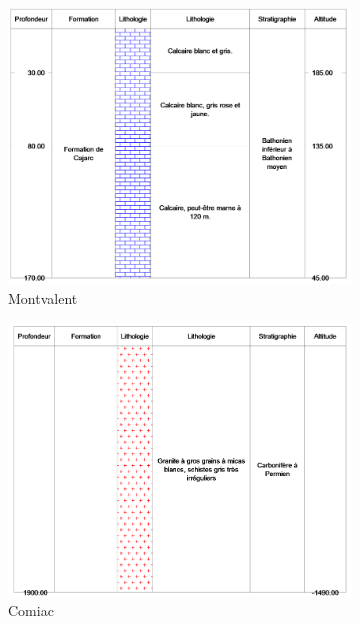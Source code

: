 \documentclass[11pt,french,a4paper]{article}
\begin{document}
\begin{figure}
     \centering
     \begin{subfigure}[b]{0.48\textwidth}
         \centering
         \includegraphics[width=\textwidth]{image/annexe/chap4/minees/montvalent.png}
         \caption{Montvalent}
     \end{subfigure}
     \begin{subfigure}[b]{0.48\textwidth}
         \centering
         \includegraphics[width=\textwidth]{image/annexe/chap4/minees/comiac.png}
         \caption{Comiac}
     \end{subfigure}
     \begin{subfigure}[b]{0.48\textwidth}

\end{subfigure}
\end{figure}
\end{document}
